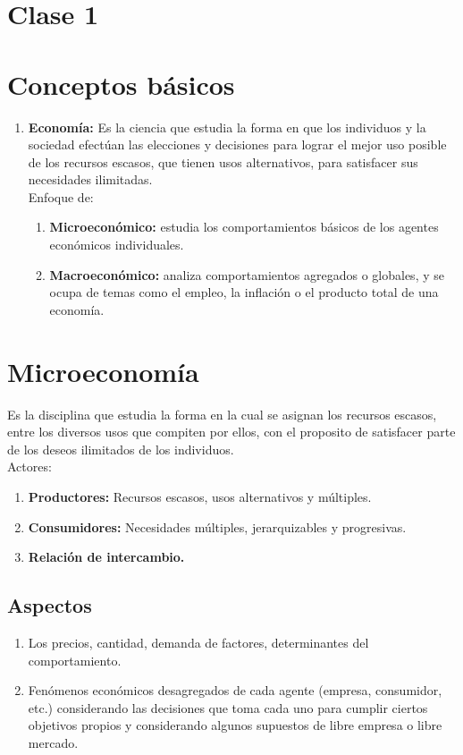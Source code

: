 \documentclass{templateNote}
\begin{document}
\newpage
\section*{Clase 1}
\section{Conceptos básicos}
\begin{enumerate}
    \item \textbf{Economía:} Es la ciencia que estudia la forma en que los individuos y la sociedad efectúan las elecciones y decisiones para lograr el mejor uso posible de los recursos escasos, que tienen usos alternativos, para satisfacer sus necesidades ilimitadas.\\
    
    Enfoque de:
    \begin{enumerate}
        \item \textbf{Microeconómico:} estudia los comportamientos básicos de los
        agentes económicos individuales.
        \item \textbf{Macroeconómico:} analiza comportamientos agregados o
        globales, y se ocupa de temas como el empleo, la inflación o el
        producto total de una economía.
    \end{enumerate}
    
\end{enumerate}

\section{Microeconomía}
\indent
Es la disciplina que estudia la forma en la cual
se asignan los recursos escasos, entre los diversos usos que
compiten por ellos, con el proposito de satisfacer parte de los
deseos ilimitados de los individuos.\\
Actores:
\begin{enumerate}
    \item \textbf{Productores:} Recursos escasos, usos alternativos y múltiples.
    \item \textbf{Consumidores:} Necesidades múltiples, jerarquizables y progresivas. 
    \item \textbf{Relación de intercambio.}
\end{enumerate} 

\subsection{Aspectos}
\begin{enumerate}
    \item Los precios, cantidad, demanda de factores, determinantes del
    comportamiento.
    
    \item Fenómenos económicos desagregados de cada agente (empresa,
    consumidor, etc.) considerando las decisiones que toma cada uno
    para cumplir ciertos objetivos propios y considerando algunos
    supuestos de libre empresa o libre mercado.
\end{enumerate}
\end{document}
